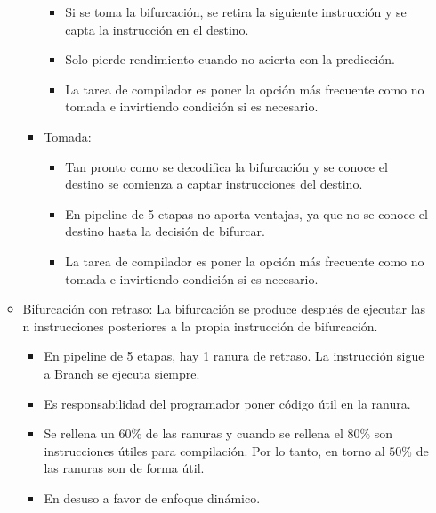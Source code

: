 \documentclass[12pt, twoside, openright]{report} %
\begin{document}
\begin{itemize}
\begin{itemize}
\begin{itemize}
\begin{itemize}
              \item Si se toma la bifurcación, se retira la siguiente instrucción y se capta la instrucción en el destino.
    
              \item Solo pierde rendimiento cuando no acierta con la predicción.
    
              \item La tarea de compilador es poner la opción más frecuente como no tomada e invirtiendo condición si es necesario.
            \end{itemize}
          
          
          \item Tomada:
            \begin{itemize}
              \item Tan pronto como se decodifica la bifurcación y se conoce el destino se comienza a captar instrucciones del destino.

              \item En pipeline de 5 etapas no aporta ventajas, ya que no se conoce el destino hasta la decisión de bifurcar.
    
              \item La tarea de compilador es poner la opción más frecuente como no tomada e invirtiendo condición si es necesario.
            \end{itemize}
        \end{itemize}
            

        \item Bifurcación con retraso: La bifurcación se produce después de ejecutar las n instrucciones posteriores a la propia instrucción de bifurcación.
        \begin{itemize}
          \item En pipeline de 5 etapas, hay 1 ranura de retraso. La instrucción sigue a Branch se ejecuta siempre.

          \item Es responsabilidad del programador poner código útil en la ranura.

          \item Se rellena un $60\%$ de las ranuras y cuando se rellena el $80\%$ son instrucciones útiles para compilación. Por lo tanto, en torno al $50\%$ de las ranuras son de forma útil.
          
          \item En desuso a favor de enfoque dinámico.
        \end{itemize}
            

\end{itemize}
\end{itemize}
\end{document}
